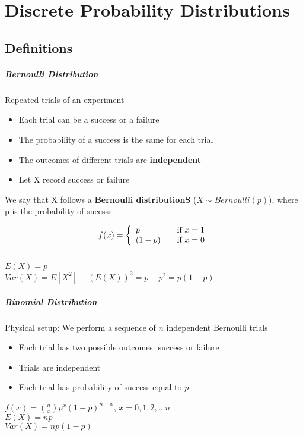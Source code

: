 \documentclass[12pt]{report}
\begin{document}
\chapter{Discrete Probability Distributions}
  \section{Definitions}
    \paragraph{Bernoulli Distribution} Repeated trials of an experiment
    \begin{itemize}
      \item Each trial can be a success or a failure
      \item The probability of a success is the same for each trial
      \item The outcomes of different trials are \textbf{independent}
      \item Let X record success or failure
    \end{itemize}
    We say that X follows a \textbf{Bernoulli distributionS} ($X \sim
    Bernoulli(p)$), where p is the probability of sucesss

    \[ f(x) = \left\{
      \begin{array}{l l}
        p     & \quad \text{if $x = 1$}\\
        (1-p) & \quad \text{if $x = 0$}
      \end{array}
      \right.  \]\\
      $E(X) = p$\\
      $Var(X) = E[X^2] - (E(X))^2 = p - p^2 = p(1-p)$

    \paragraph{Binomial Distribution}
      Physical setup: We perform a sequence of $n$ independent Bernoulli trials
      \begin{itemize}
        \item Each trial has two possible outcomes: success or failure
        \item Trials are independent
        \item Each trial has probability of success equal to $p$
      \end{itemize}

      $f(x) = \binom{n}{x} p^x(1-p)^{n-x}$, $x = 0, 1, 2, ... n$\\
      $E(X) = np$\\
      $Var(X) = np(1-p)$
\end{document}

